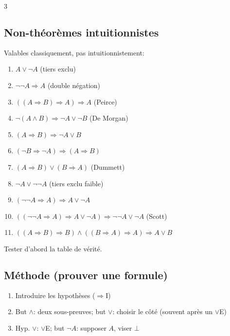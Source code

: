 \documentclass[12pt, a4paper]{article}
\begin{document}
\begin{multicols*}{3}
	\subsection{Non-théorèmes intuitionnistes}
	Valables classiquement, pas intuitionnistement:
	\begin{enumerate}[\roman*.]
		\item $A\vee\neg A$ (tiers exclu)
		\item $\neg\neg A\Rightarrow A$ (double négation)
		\item $((A\Rightarrow B)\Rightarrow A)\Rightarrow A$ (Peirce)
		\item $\neg(A\wedge B)\Rightarrow\neg A\vee\neg B$ (De Morgan)
		\item $(A\Rightarrow B)\Rightarrow\neg A\vee B$
		\item $(\neg B\Rightarrow\neg A)\Rightarrow(A\Rightarrow B)$
		\item $(A\Rightarrow B)\vee(B\Rightarrow A)$ (Dummett)
		\item $\neg A\vee\neg\neg A$ (tiers exclu faible)
		\item $(\neg\neg A\Rightarrow A)\Rightarrow A\vee\neg A$
		\item $((\neg\neg A\Rightarrow A)\Rightarrow A\vee\neg A)\Rightarrow\neg\neg A\vee\neg A$ (Scott)
		\item $((A\Rightarrow B)\Rightarrow B)\wedge((B\Rightarrow A)\Rightarrow A)\Rightarrow A\vee B$
	\end{enumerate}
	Tester d'abord la table de vérité.

	\subsection{Méthode (prouver une formule)}
	\begin{enumerate}[\roman*.]
		\item Introduire les hypothèses ($\Rightarrow$I)
		\item But $\wedge$: deux sous-preuves; but $\vee$: choisir le côté (souvent après un $\vee$E)
		\item Hyp. $\vee$: $\vee$E; but $\neg A$: supposer $A$, viser $\bot$
	\end{enumerate}

	\colbreak

\end{multicols*}
\end{document}
